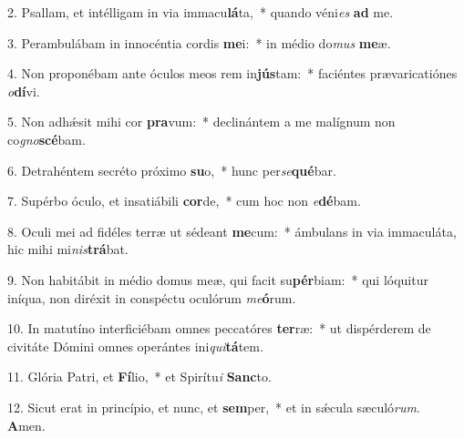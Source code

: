 2. Psallam, et intélligam in via immacu\textbf{lá}ta,~*  quando véni\textit{es} \textbf{ad} me.\

3. Perambulábam in innocéntia cordis \textbf{me}i:~*  in médio do\textit{mus} \textbf{me}æ.\

4. Non proponébam ante óculos meos rem in\textbf{jús}tam:~*  faciéntes prævaricatiónes \textit{o}\textbf{dí}vi.\

5. Non adhǽsit mihi cor \textbf{pra}vum:~*  declinántem a me malígnum non co\textit{gno}\textbf{scé}bam.\

6. Detrahéntem secréto próximo \textbf{su}o,~*  hunc per\textit{se}\textbf{qué}bar.\

7. Supérbo óculo, et insatiábili \textbf{cor}de,~*  cum hoc non \textit{e}\textbf{dé}bam.\

8. Oculi mei ad fidéles terræ ut sédeant \textbf{me}cum:~*  ámbulans in via immaculáta, hic mihi mi\textit{nis}\textbf{trá}bat.\

9. Non habitábit in médio domus meæ, qui facit su\textbf{pér}biam:~*  qui lóquitur iníqua, non diréxit in conspéctu oculórum \textit{me}\textbf{ó}rum.\

10. In matutíno interficiébam omnes peccatóres \textbf{ter}ræ:~*  ut dispérderem de civitáte Dómini omnes operántes ini\textit{qui}\textbf{tá}tem.\

11. Glória Patri, et \textbf{Fí}lio,~*  et Spirítu\textit{i} \textbf{Sanc}to.\

12. Sicut erat in princípio, et nunc, et \textbf{sem}per,~*  et in sǽcula sæculó\textit{rum}. \textbf{A}men.\

